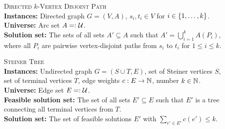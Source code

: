 \begin{samepage}
    \begin{mdframed}
    	\begin{description}
        \item[]\textsc{Directed} $k$-\textsc{Vertex Disjoint Path}\hfill\\
        \textbf{Instances:} Directed graph $G = (V, A)$, $s_i, t_i \in V$ for $i \in \{ 1, \ldots, k \}$.\\
        \textbf{Universe:} Arc set $A =: \mathcal{U}$.\\
        \textbf{Solution set:} The sets of all sets $A' \subseteq A$ such that $A' = \bigcup^k_{i = 1} A(P_i)$, where all $P_i$ are pairwise vertex-disjoint paths from $s_i$ to $t_i$ for $1 \leq i \leq k$.
    	\end{description}
    \end{mdframed}
\end{samepage}

\begin{samepage}
    \begin{mdframed}
    	\begin{description}
        \item[]\textsc{Steiner Tree}\hfill\\
        \textbf{Instances:} Undirected graph $G = (S \cup T, E)$, set of Steiner vertices $S$, set of terminal vertices $T$, edge weights $c: E \rightarrow \mathbb{N}$, number $k \in \mathbb{N}$.\\
        \textbf{Universe:} Edge set $E =: \mathcal{U}$.\\
        \textbf{Feasible solution set:} The set of all sets $E' \subseteq E$ such that $E'$ is a tree connecting all terminal vertices from $T$.\\
        \textbf{Solution set:} The set of feasible solutions $E'$ with $\sum_{e' \in E'} c(e') \leq k$.
    	\end{description}
    \end{mdframed}
\end{samepage}

